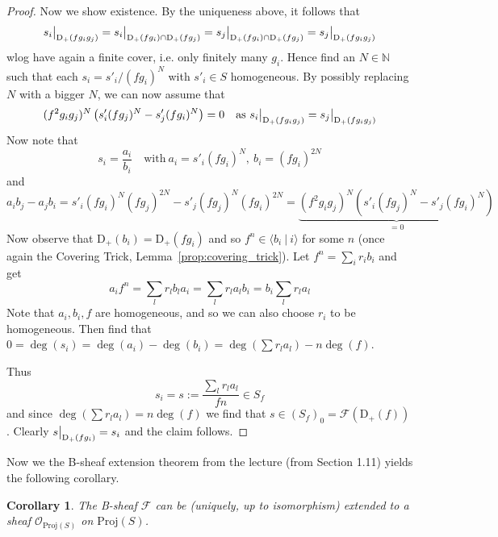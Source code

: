 \documentclass{scrartcl}
\newcommand{\N}{\mathbb{N}}
\newcommand{\D}[1]{\mathrm{D}_+(#1)}
\newcommand{\Proj}{\mathrm{Proj}}
\renewcommand{\O}{\mathcal{O}}
\newcommand\restr[2]{{
    \left.\kern-\nulldelimiterspace
    #1
    \vphantom{\big|}
    \right|_{#2}
}}
\newtheorem{corollary}[subsection]{Corollary}
\theoremstyle{definition}
\begin{document}
\begin{proof}
    Now we show existence.
    By the uniqueness above, it follows that
    \begin{equation*}
        \restr{s_i}{\D{fg_ig_j}} = \restr{s_i}{\D{fg_i} \cap \D{fg_j}} = \restr{s_j}{\D{fg_i} \cap \D{fg_j}} = \restr{s_j}{\D{fg_ig_j}}
    \end{equation*}
    wlog have again a finite cover, i.e. only finitely many $g_i$.
    Hence find an $N \in \N$ such that each $s_i = s'_i / (fg_i)^N$ with $s'_i \in S$ homogeneous.
    By possibly replacing $N$ with a bigger $N$, we can now assume that
    \begin{equation*}
        (f^2g_ig_j)^N \left( s'_i (f g_j)^N - s'_j (f g_i)^N \right) = 0 \quad \text{as $\restr{s_i}{\D{fg_ig_j}} = \restr{s_j}{\D{fg_ig_j}}$}
    \end{equation*}
    Now note that
    \begin{equation*}
        s_i = \frac {a_i} {b_i} \quad \text{with}\ a_i = s'_i(f g_i)^N, \ b_i = (f g_i)^{2N}
    \end{equation*}
    and
    \begin{equation*}
        a_i b_j - a_j b_i = s'_i (f g_i)^N (f g_j)^{2N} - s'_j (f g_j)^N (f g_i)^{2N} = \underbrace{(f^2g_ig_j)^N \left(s'_i (fg_j)^N - s'_j (fg_i)^N \right)}_{= 0}
    \end{equation*}
    Now observe that $\D{b_i} = \D{fg_i}$ and so $f^n \in \langle b_i \ | \ i \rangle$ for some $n$ (once again the Covering Trick, Lemma~\ref{prop:covering_trick}).
    Let $f^n = \sum_i r_i b_i$ and get
    \begin{equation*}
        a_i f^n = \sum_l r_l b_l a_i = \sum_l r_l a_l b_i = b_i \sum_l r_l a_l
    \end{equation*}
    Note that $a_i, b_i, f$ are homogeneous, and so we can also choose $r_i$ to be homogeneous.
    Then find that $0 = \deg(s_i) = \deg(a_i) - \deg(b_i) = \deg(\sum r_l a_l) - n\deg(f)$.

    Thus
    \begin{equation*}
        s_i = s := \frac {\sum_l r_l a_l} {fn} \in S_f
    \end{equation*}
    and since $\deg(\sum r_l a_l) = n\deg(f)$ we find that $s \in (S_f)_0 = \mathcal{F}(\D{f})$.
    Clearly $\restr{s}{\D{fg_i}} = s_i$ and the claim follows.
\end{proof}
Now we the B-sheaf extension theorem from the lecture (from Section 1.11) yields the following corollary.
\begin{corollary}
    The B-sheaf $\mathcal{F}$ can be (uniquely, up to isomorphism) extended to a sheaf $\O_{\Proj(S)}$ on $\Proj(S)$.
\end{corollary}
\end{document}
